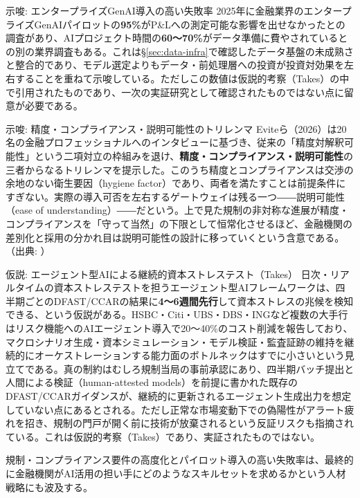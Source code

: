 \begin{insight}{示唆: エンタープライズGenAI導入の高い失敗率}
2025年に金融業界のエンタープライズGenAIパイロットの\textbf{95\%}がP\&Lへの測定可能な影響を出せなかったとの調査があり、AIプロジェクト時間の\textbf{60〜70\%}がデータ準備に費やされているとの別の業界調査もある。これは\S\ref{sec:data-infra}で確認したデータ基盤の未成熟さと整合的であり、モデル選定よりもデータ・前処理層への投資が投資対効果を左右することを重ねて示唆している。ただしこの数値は仮説的考察（Takes）の中で引用されたものであり、一次の実証研究として確認されたものではない点に留意が必要である。
\end{insight}

\begin{insight}{示唆: 精度・コンプライアンス・説明可能性のトリレンマ}
Eviteら（2026）は20名の金融プロフェッショナルへのインタビューに基づき、従来の「精度対解釈可能性」という二項対立の枠組みを退け、\textbf{精度・コンプライアンス・説明可能性}の三者からなるトリレンマを提示した。このうち精度とコンプライアンスは交渉の余地のない衛生要因（hygiene factor）であり、両者を満たすことは前提条件にすぎない。実際の導入可否を左右するゲートウェイは残る一つ――説明可能性（ease of understanding）――だという。上で見た規制の非対称な進展が精度・コンプライアンスを「守って当然」の下限として恒常化させるほど、金融機関の差別化と採用の分かれ目は説明可能性の設計に移っていくという含意である。（出典: \cite{fintrilemma2026}）
\end{insight}

\begin{insight}{仮説: エージェント型AIによる継続的資本ストレステスト（Takes）}
日次・リアルタイムの資本ストレステストを担うエージェント型AIフレームワークは、四半期ごとのDFAST/CCARの結果に\textbf{4〜6週間先行}して資本ストレスの兆候を検知できる、という仮説がある。HSBC・Citi・UBS・DBS・INGなど複数の大手行はリスク機能へのAIエージェント導入で20〜40\%のコスト削減を報告しており、マクロシナリオ生成・資本シミュレーション・モデル検証・監査証跡の維持を継続的にオーケストレーションする能力面のボトルネックはすでに小さいという見立てである。真の制約はむしろ規制当局の事前承認にあり、四半期バッチ提出と人間による検証（human-attested models）を前提に書かれた既存のDFAST/CCARガイダンスが、継続的に更新されるエージェント生成出力を想定していない点にあるとされる。ただし正常な市場変動下での偽陽性がアラート疲れを招き、規制の門戸が開く前に技術が放棄されるという反証リスクも指摘されている。これは仮説的考察（Takes）であり、実証されたものではない。
\end{insight}

規制・コンプライアンス要件の高度化とパイロット導入の高い失敗率は、最終的に金融機関がAI活用の担い手にどのようなスキルセットを求めるかという人材戦略にも波及する。

